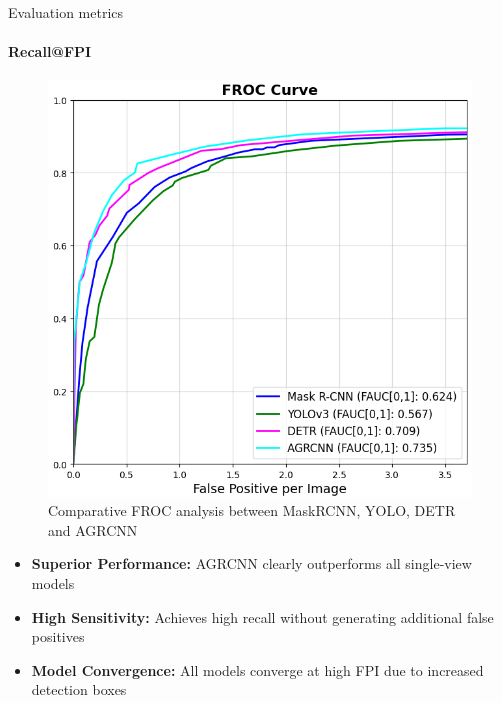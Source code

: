 \documentclass[8pt,aspectratio=169,xcolor=dvipsnames]{beamer}
\begin{document}
\begin{frame}{Evaluation metrics}
\framesubtitle{Recall@FPI}
\begin{figure}
    \centering
    \includegraphics[width=0.35\linewidth]{agn_froc.png}
    \caption{Comparative FROC analysis between MaskRCNN, YOLO, DETR and AGRCNN}
    \label{fig:agn_froc}
\end{figure}
\begin{itemize}
    \item \textbf{Superior Performance:} AGRCNN clearly outperforms all single-view models
    \item \textbf{High Sensitivity:} Achieves high recall without generating additional false positives
    \item \textbf{Model Convergence:} All models converge at high FPI due to increased detection boxes
\end{itemize}
\end{frame}
\end{document}
